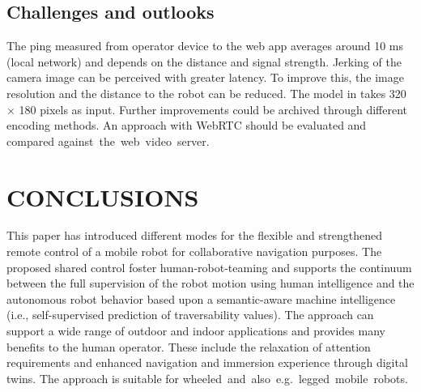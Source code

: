 \documentclass[letterpaper, 10 pt, conference]{ieeeconf}  %
\begin{document}
\subsection{Challenges and outlooks}
The ping measured from operator device to the web app averages around 10 ms (local network) and depends on the distance and signal strength. 
Jerking of the camera image can be perceived with greater latency. To improve this, the image resolution and the distance to the robot can be reduced. The model in \cite{wayfaster} takes 320 $\times$ 180 pixels as input. Further improvements could be archived through different encoding methods.
An approach with WebRTC should be evaluated and compared \mbox{against the web video server.}



\section{CONCLUSIONS}
This paper has introduced different modes for the flexible and strengthened remote control of a mobile robot for collaborative navigation purposes. The proposed  shared control foster human-robot-teaming and supports the continuum between the full supervision of the robot motion using human intelligence  and the autonomous robot behavior based upon a semantic-aware machine intelligence (i.e., self-supervised prediction of traversability values). The approach can support a wide range of outdoor and indoor applications and provides many benefits to the human operator. These include the relaxation of attention requirements and enhanced navigation and immersion experience through digital twins. The approach is suitable for  \mbox{wheeled and also e.g. legged mobile robots.}

\addtolength{\textheight}{-12cm}   %




\end{document}
